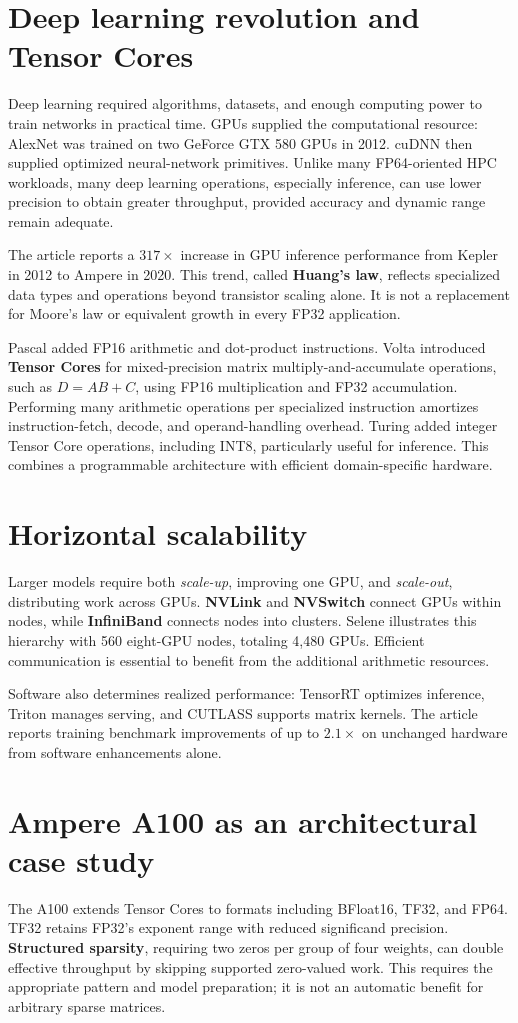 \documentclass[11pt,a4paper]{article}
\newcommand{\topic}[1]{\section*{#1}}
\begin{document}
\topic{Deep learning revolution and Tensor Cores}
Deep learning required algorithms, datasets, and enough computing power to
train networks in practical time. GPUs supplied the computational resource:
AlexNet was trained on two GeForce GTX 580 GPUs in 2012. cuDNN then supplied
optimized neural-network primitives. Unlike many FP64-oriented HPC workloads,
many deep learning operations, especially inference, can use lower precision
to obtain greater throughput, provided accuracy and dynamic range remain adequate.

The article reports a $317\times$ increase in GPU inference performance
from Kepler in 2012 to Ampere in 2020. This trend, called \textbf{Huang's law},
reflects specialized data types and operations beyond transistor scaling
alone. It is not a replacement for Moore's law or equivalent growth in
every FP32 application.

Pascal added FP16 arithmetic and dot-product instructions. Volta introduced
\textbf{Tensor Cores} for mixed-precision matrix multiply-and-accumulate
operations, such as $D=AB+C$, using FP16 multiplication and FP32 accumulation.
Performing many arithmetic operations per specialized instruction amortizes
instruction-fetch, decode, and operand-handling overhead. Turing added integer
Tensor Core operations, including INT8, particularly useful for inference.
This combines a programmable architecture with efficient domain-specific hardware.

\topic{Horizontal scalability}
Larger models require both \emph{scale-up}, improving one GPU, and
\emph{scale-out}, distributing work across GPUs. \textbf{NVLink} and
\textbf{NVSwitch} connect GPUs within nodes, while \textbf{InfiniBand}
connects nodes into clusters. Selene illustrates this hierarchy with 560
eight-GPU nodes, totaling 4,480 GPUs. Efficient communication is essential
to benefit from the additional arithmetic resources.

Software also determines realized performance: TensorRT optimizes inference,
Triton manages serving, and CUTLASS supports matrix kernels. The article
reports training benchmark improvements of up to $2.1\times$ on unchanged
hardware from software enhancements alone.

\topic{Ampere A100 as an architectural case study}
The A100 extends Tensor Cores to formats including BFloat16, TF32, and FP64.
TF32 retains FP32's exponent range with reduced significand precision.
\textbf{Structured sparsity}, requiring two zeros per group of four weights,
can double effective throughput by skipping supported zero-valued work.
This requires the appropriate pattern and model preparation; it is not an
automatic benefit for arbitrary sparse matrices.
\end{document}
